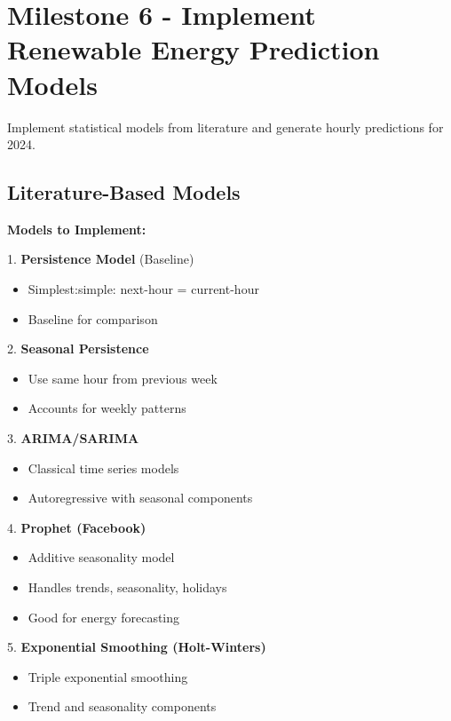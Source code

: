 \documentclass[11pt,a4paper]{article}
\begin{document}
\section{Milestone 6 - Implement Renewable Energy Prediction Models}

\begin{objectivebox}
Implement statistical models from literature and generate hourly predictions for 2024.
\end{objectivebox}

\subsection{Literature-Based Models}

\textbf{Models to Implement:}

1. \textbf{Persistence Model} (Baseline)
\begin{itemize}
    \item Simplest:simple: next-hour = current-hour
    \item Baseline for comparison
\end{itemize}

2. \textbf{Seasonal Persistence}
\begin{itemize}
    \item Use same hour from previous week
    \item Accounts for weekly patterns
\end{itemize}

3. \textbf{ARIMA/SARIMA}
\begin{itemize}
    \item Classical time series models
    \item Autoregressive with seasonal components
\end{itemize}

4. \textbf{Prophet (Facebook)}
\begin{itemize}
    \item Additive seasonality model
    \item Handles trends, seasonality, holidays
    \item Good for energy forecasting
\end{itemize}

5. \textbf{Exponential Smoothing (Holt-Winters)}
\begin{itemize}
    \item Triple exponential smoothing
    \item Trend and seasonality components
\end{itemize}
\end{document}
